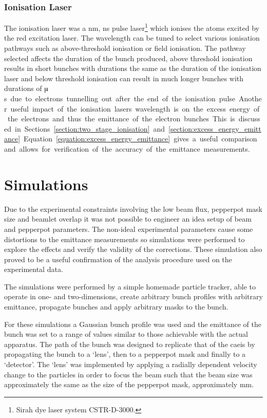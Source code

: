 \subsubsection{Ionisation Laser}
The ionisation laser was a \unit[457-493]{nm}, \unit[5]{ns} pulse laser\footnote{Sirah dye laser system CSTR-D-3000.} which ionises the atoms excited by the red excitation laser.
The wavelength can be tuned to select various ionisation pathways such as above-threshold ionisation or field ionisation.
The pathway selected affects the duration of the bunch produced, above threshold ionisation results in short bunches with durations the same as the duration of the ionisation laser and below threshold ionisation can result in much longer bunches with durations of \unit[10s]{$\muup$s} due to electrons tunnelling out after the end of the ionisation pulse.

Another useful impact of the ionisation lasers wavelength is on the excess energy of the electrons and thus the emittance of the electron bunches.
This is discussed in Sections~\ref{section:two_stage_ionisation} and \ref{section:excess_energy_emittance}.
Equation~\ref{equation:excess_energy_emittance} gives a useful comparison and allows for verification of the accuracy of the emittance measurements.

\section{Simulations}\label{section:pepperpot_simulations}

Due to the experimental constraints involving the low beam flux, pepperpot mask size and beamlet overlap it was not possible to engineer an idea setup of beam and pepperpot parameters.
The non-ideal experimental parameters cause some distortions to the emittance measurements so simulations were performed to explore the effects and verify the validity of the corrections.
These simulation also proved to be a useful confirmation of the analysis procedure used on the experimental data.

The simulations were performed by a simple homemade particle tracker, able to operate in one- and two-dimensions, create arbitrary bunch profiles with arbitrary emittance, propagate bunches and apply arbitrary masks to the bunch.

For these simulations a Gaussian bunch profile was used and the emittance of the bunch was set to a range of values similar to those achievable with the actual apparatus.
The path of the bunch was designed to replicate that of the \gls{caeis} by propagating the bunch to a `lens', then to a pepperpot mask and finally to a `detector'.
The `lens' was implemented by applying a radially dependent velocity change to the particles in order to focus the beam such that the beam size was approximately the same as the size of the pepperpot mask, approximately \unit[2]{mm}.

